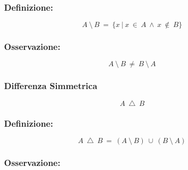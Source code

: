         \subsubsection*{Definizione:}
        
        \begin{LARGE}
            \begin{equation*}
                A\ \setminus\ B\ =\ \{x\ |\ x\ \in\ A\ \land\ x\ \notin\ B\}
            \end{equation*}
        \end{LARGE}

        \subsubsection*{Osservazione:}

        \begin{Large}
            \begin{equation*}
                A\ \setminus\ B\ \ne\ B\ \setminus\ A
            \end{equation*}
        \end{Large}

        \subsubsection{Differenza Simmetrica}
        \begin{LARGE}
            \begin{equation*}
                A\ \bigtriangleup\ B
            \end{equation*}
        \end{LARGE}
        
        \subsubsection*{Definizione:}
        
        \begin{LARGE}
            \begin{equation*}
                A\ \bigtriangleup\ B\ =\ (A\ \setminus\ B)\ \cup\ (B\ \setminus\ A)
            \end{equation*}
        \end{LARGE}

        \subsubsection*{Osservazione:}

